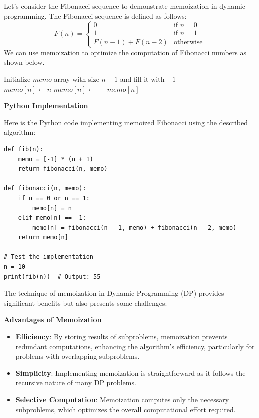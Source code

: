 \documentclass[12pt]{book} %
\begin{document}
Let's consider the Fibonacci sequence to demonstrate memoization in dynamic programming. The Fibonacci sequence is defined as follows:
\FloatBarrier
\[
F(n) =
\begin{cases} 
0 & \text{if } n = 0 \\
1 & \text{if } n = 1 \\
F(n-1) + F(n-2) & \text{otherwise}
\end{cases}
\]
\FloatBarrier
We can use memoization to optimize the computation of Fibonacci numbers as shown below.
\FloatBarrier
\begin{algorithm}
\caption{Memoized Fibonacci}
\begin{algorithmic}[1]
    \State Initialize $memo$ array with size $n+1$ and fill it with $-1$
    \State \Return {}
\EndFunction
\\
        \State $memo[n] \gets n$
        \State $memo[n] \gets$  + 
    \EndIf
    \State \Return $memo[n]$
\EndFunction
\end{algorithmic}
\end{algorithm}
\FloatBarrier
\textbf{Python Implementation}

Here is the Python code implementing memoized Fibonacci using the described algorithm:
\FloatBarrier
\begin{lstlisting}
def fib(n):
    memo = [-1] * (n + 1)
    return fibonacci(n, memo)

def fibonacci(n, memo):
    if n == 0 or n == 1:
        memo[n] = n
    elif memo[n] == -1:
        memo[n] = fibonacci(n - 1, memo) + fibonacci(n - 2, memo)
    return memo[n]

# Test the implementation
n = 10
print(fib(n))  # Output: 55
\end{lstlisting}
\FloatBarrier

The technique of memoization in Dynamic Programming (DP) provides significant benefits but also presents some challenges:

\textbf{Advantages of Memoization}
\begin{itemize}
    \item \textbf{Efficiency}: By storing results of subproblems, memoization prevents redundant computations, enhancing the algorithm's efficiency, particularly for problems with overlapping subproblems.
    \item \textbf{Simplicity}: Implementing memoization is straightforward as it follows the recursive nature of many DP problems.
    \item \textbf{Selective Computation}: Memoization computes only the necessary subproblems, which optimizes the overall computational effort required.
\end{itemize}
\end{document}
